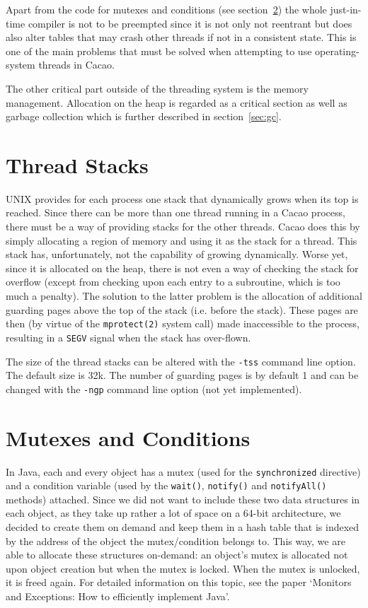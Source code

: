 \documentclass[twocolumn,a4paper]{article}      %
\begin{document}
Apart from the code for mutexes and conditions (see
section~\ref{sec:synchronization}) the whole just-in-time compiler is
not to be preempted since it is not only not reentrant but does also
alter tables that may crash other threads if not in a consistent
state. This is one of the main problems that must be solved when
attempting to use operating-system threads in Cacao.

The other critical part outside of the threading system is the memory
management. Allocation on the heap is regarded as a critical section
as well as garbage collection which is further described in
section~\ref{sec:gc}.

\section{Thread Stacks}
\label{sec:threadstacks}

UNIX provides for each process one stack that dynamically grows when
its top is reached.  Since there can be more than one thread running
in a Cacao process, there must be a way of providing stacks for the
other threads. Cacao does this by simply allocating a region of memory
and using it as the stack for a thread. This stack has, unfortunately,
not the capability of growing dynamically. Worse yet, since it is
allocated on the heap, there is not even a way of checking the stack
for overflow (except from checking upon each entry to a subroutine,
which is too much a penalty). The solution to the latter problem is
the allocation of additional guarding pages above the top of the stack
(i.e. before the stack). These pages are then (by virtue of the
\texttt{mprotect(2)} system call) made inaccessible to the process,
resulting in a \texttt{SEGV} signal when the stack has over-flown.

The size of the thread stacks can be altered with the \texttt{-tss}
command line option. The default size is 32k. The number of guarding
pages is by default 1 and can be changed with the
\texttt{-ngp} command line option (not yet implemented).

\section{Mutexes and Conditions}
\label{sec:synchronization}

In Java, each and every object has a mutex (used for the
\texttt{synchronized} directive) and a condition variable (used by the
\texttt{wait()}, \texttt{notify()} and
\texttt{notifyAll()} methods) attached. Since we did not want to include
these two data structures in each object, as they take up rather a lot
of space on a 64-bit architecture, we decided to create them on demand
and keep them in a hash table that is indexed by the address of the
object the mutex/condition belongs to. This way, we are able to
allocate these structures on-demand: an object's mutex is allocated
not upon object creation but when the mutex is locked. When the mutex
is unlocked, it is freed again. For detailed information on this
topic, see the paper `Monitors and Exceptions: How to efficiently
implement Java'.
\end{document}

